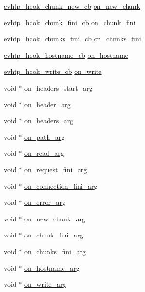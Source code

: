 \begin{DoxyCompactItemize}
\hyperlink{evhtp_8h_a788b8f65cf9ff82171da1849feeb5750}{evhtp\-\_\-hook\-\_\-chunk\-\_\-new\-\_\-cb} \hyperlink{structevhtp__hooks__s_a16e5898ad1b546019685b4c6854a0dfb}{on\-\_\-new\-\_\-chunk}
\item 
\hyperlink{evhtp_8h_ae98ecd9989d124a1450b932a677d6c0f}{evhtp\-\_\-hook\-\_\-chunk\-\_\-fini\-\_\-cb} \hyperlink{structevhtp__hooks__s_a7905e89a5d4086104635ddc867e02fe1}{on\-\_\-chunk\-\_\-fini}
\item 
\hyperlink{evhtp_8h_a29660300c43f22382a64ea48c00bf6a7}{evhtp\-\_\-hook\-\_\-chunks\-\_\-fini\-\_\-cb} \hyperlink{structevhtp__hooks__s_a0801884b636d618c7fa881668996ce4a}{on\-\_\-chunks\-\_\-fini}
\item 
\hyperlink{evhtp_8h_aefd0d1951b95e255464359decda9b9f4}{evhtp\-\_\-hook\-\_\-hostname\-\_\-cb} \hyperlink{structevhtp__hooks__s_a6de1097bdc1ddb3bf44c994e4e086f02}{on\-\_\-hostname}
\item 
\hyperlink{evhtp_8h_abd5be6b13addeeb0f180645af1538a62}{evhtp\-\_\-hook\-\_\-write\-\_\-cb} \hyperlink{structevhtp__hooks__s_a1f9dee4096564721214ecfe05707510a}{on\-\_\-write}
\item 
void $\ast$ \hyperlink{structevhtp__hooks__s_a5901f165f65b2ec87c0c0b274950be9f}{on\-\_\-headers\-\_\-start\-\_\-arg}
\item 
void $\ast$ \hyperlink{structevhtp__hooks__s_a854ac79bb3d5399c4ed366e542eea302}{on\-\_\-header\-\_\-arg}
\item 
void $\ast$ \hyperlink{structevhtp__hooks__s_aa4ea4765f3de173070b313ee276d8a43}{on\-\_\-headers\-\_\-arg}
\item 
void $\ast$ \hyperlink{structevhtp__hooks__s_ac828d71921d79c53bd3782082a392d09}{on\-\_\-path\-\_\-arg}
\item 
void $\ast$ \hyperlink{structevhtp__hooks__s_af1ca4346719c7e3b841867e153bc7504}{on\-\_\-read\-\_\-arg}
\item 
void $\ast$ \hyperlink{structevhtp__hooks__s_a6ff6528fe6d2018c55a718ca829e00be}{on\-\_\-request\-\_\-fini\-\_\-arg}
\item 
void $\ast$ \hyperlink{structevhtp__hooks__s_a85b8e90c05beef54c71c79ffb3666a91}{on\-\_\-connection\-\_\-fini\-\_\-arg}
\item 
void $\ast$ \hyperlink{structevhtp__hooks__s_aef67e2ec495e223340f3daea5448a69a}{on\-\_\-error\-\_\-arg}
\item 
void $\ast$ \hyperlink{structevhtp__hooks__s_a4607065d4c6f3cf520d7bc1988f2dfb4}{on\-\_\-new\-\_\-chunk\-\_\-arg}
\item 
void $\ast$ \hyperlink{structevhtp__hooks__s_a1f6538f0edf009f607c913eaf0400a1a}{on\-\_\-chunk\-\_\-fini\-\_\-arg}
\item 
void $\ast$ \hyperlink{structevhtp__hooks__s_a523b6dd10fc474231833827481d802b9}{on\-\_\-chunks\-\_\-fini\-\_\-arg}
\item 
void $\ast$ \hyperlink{structevhtp__hooks__s_a5de675ef167086ff6492082337130b2f}{on\-\_\-hostname\-\_\-arg}
\item 
void $\ast$ \hyperlink{structevhtp__hooks__s_a9aa579b8a735219a73e5e37c390a9580}{on\-\_\-write\-\_\-arg}
\end{DoxyCompactItemize}



